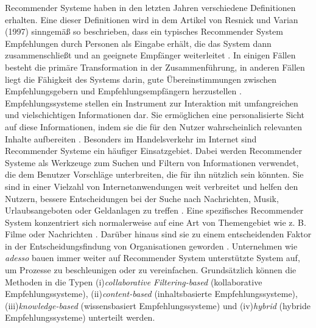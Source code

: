 Recommender Systeme haben in den letzten Jahren verschiedene Definitionen erhalten. Eine dieser Definitionen wird in dem Artikel von Resnick und Varian (1997) sinngemäß so beschrieben, dass ein typisches Recommender System Empfehlungen durch Personen als Eingabe erhält, die das System dann zusammenschließt und an geeignete Empfänger weiterleitet \cite{burke2011recommender}. In einigen Fällen besteht die primäre Transformation in der Zusammenführung, in anderen Fällen liegt die Fähigkeit des Systems darin, gute Übereinstimmungen zwischen Empfehlungsgebern und Empfehlungsempfängern herzustellen \cite{burke2011recommender}. Empfehlungssysteme stellen ein Instrument zur Interaktion mit umfangreichen und vielschichtigen Informationen dar. Sie ermöglichen eine personalisierte Sicht auf diese Informationen, indem sie die für den Nutzer wahrscheinlich relevanten Inhalte aufbereiten \cite{burke2011recommender}. Besonders im Handelsverkehr im Internet sind Recommender Systeme ein häufiger Einsatzgebiet. Dabei werden Recommender Systeme als Werkzeuge zum Suchen und Filtern von Informationen verwendet, die dem Benutzer Vorschläge unterbreiten, die für ihn nützlich sein könnten. Sie sind in einer Vielzahl von Internetanwendungen weit verbreitet und helfen den Nutzern, bessere Entscheidungen bei der Suche nach Nachrichten, Musik, Urlaubsangeboten oder Geldanlagen zu treffen \cite{ricci2014recommender}. Eine spezifisches Recommender System konzentriert sich normalerweise auf eine Art von Themengebiet wie z. B. Filme oder Nachrichten \cite{ricci2014recommender}. Darüber hinaus sind sie zu einem entscheidenden Faktor in der Entscheidungsfindung von Organisationen geworden \cite{chartron2014general}. Unternehmen wie \emph{adesso} bauen immer weiter auf Recommender System unterstützte System auf, um Prozesse zu beschleunigen oder zu vereinfachen. Grundsätzlich können die Methoden in die Typen (i)\emph{collaborative Filtering-based} (kollaborative Empfehlungssysteme), (ii)\emph{content-based} (inhaltsbasierte Empfehlungssysteme), (iii)\emph{knowledge-based} (wissensbasiert Empfehlungssysteme) und (iv)\emph{hybrid} (hybride Empfehlungssysteme) unterteilt werden.\\

